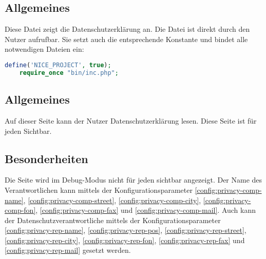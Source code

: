 \subsection{Allgemeines} Diese Datei zeigt die Datenschutzerklärung an.
Die Datei ist direkt durch den Nutzer aufrufbar. Sie setzt auch die entsprechende Konstante und bindet alle notwendigen Dateien ein:
\begin{lstlisting}[language=php]
	define('NICE_PROJECT', true);
	require_once "bin/inc.php";
\end{lstlisting}
\subsection{Allgemeines}
Auf dieser Seite kann der Nutzer Datenschutzerklärung lesen. Diese Seite ist für jeden Sichtbar.
\subsection{Besonderheiten}
Die Seite wird im Debug-Modus nicht für jeden sichtbar angezeigt. Der Name des Verantwortlichen kann mittels der Konfigurationsparameter \autoref{config:privacy-comp-name}, \autoref{config:privacy-comp-street}, \autoref{config:privacy-comp-city}, \autoref{config:privacy-comp-fon}, \autoref{config:privacy-comp-fax} und \autoref{config:privacy-comp-mail}. Auch kann der Datenschutzverantwortliche mittels der Konfigurationsparameter \autoref{config:privacy-rep-name}, \autoref{config:privacy-rep-pos}, \autoref{config:privacy-rep-street}, \autoref{config:privacy-rep-city}, \autoref{config:privacy-rep-fon}, \autoref{config:privacy-rep-fax} und \autoref{config:privacy-rep-mail} gesetzt werden.
